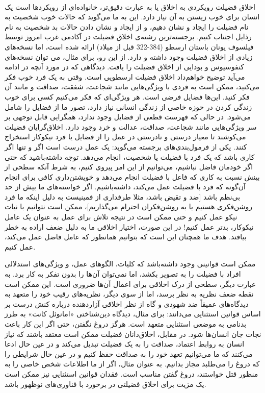 \paragraph{}
اخلاق فضیلت رویکردی به اخلاق یا به عبارت دقیق‌تر، خانواده‌ای از رویکردها است یک انسان برای خوب زیستن به آن نیاز دارد.
این به ما می‌گوید که حالات خوب شخصیت به نام فضیلت را ایجاد و نشان دهیم، و از ایجاد و نشان دادن حالات بد شخصیت به نام رذایل اجتناب کنیم.
برجسته‌ترین رشته‌ی اخلاق فضیلت در آکادمی غرب امروز توسط فیلسوف یونان باستان ارسطو (384-322 قبل از میلاد) ارائه شده است، اما نسخه‌های زیادی از اخلاق فضیلت وجود داشته و دارد.
از این رو، برای مثال، می توان نسخه‌های کنفوسیوس و بودایی از اخلاق فضیلت را یافت.
دیدگاهی که در مورد آنچه در ادامه می‌آید توضیح خواهم‌داد اخلاق فضیلت ارسطویی است.
وقتی به یک فرد خوب فکر می‌کنید، ممکن است به فردی با ویژگی‌هایی مانند شجاعت، شفقت، صداقت و مانند آن فکر کنید.
این‌ها فضایل فرضی است.
هر ویژگی‌ای که فکر می‌کنیم کسی برای خوب زندگی کردن در حوزه خاصی از زندگی انسانی نیاز دارد، تصور ما از فضایل را شامل می‌شود.
در حالی که فهرست قطعی از فضایل وجود ندارد، همگرایی قابل توجهی بر سر ویژگی‌هایی مانند شجاعت، صداقت، عدالت و خرد وجود دارد.
اخلاق‌گرایان فضیلت می‌کوشند تا معیار درستی و نادرستی در عمل را از فضایل یا فرد نیکوکار استخراج کنند.
یکی از فرمول‌بندی‌های برجسته می‌گوید: یک عمل درست است اگر و تنها اگر کاری باشد که یک فرد با فضیلت یا شخصیت، انجام می‌دهد.
توجه داشته‌باشید که حتی اگر خودمان فاضل نباشیم، می‌توانیم از این امر پیروی کنیم، به شرط آنکه سطحی از بینش نسبت به کاری که فاعل با فضیلت انجام می‌دهد و خویشتن‌داری کافی برای انجام آن‌گونه که فرد با فضیلت عمل می‌کند، داشته‌باشیم.
اگر خواسته‌های ما بیش از حد بی‌نظم باشد [ضد و تقیض باشد، مثلا طرفداری از فمینیست به دلیل اینکه ما فرد روشن‌فکری هستیم یا به روشن‌فکران احترام می‌گذاریم]، ممکن است نتوانیم با نیات نیکو عمل کنیم و حتی ممکن است در نتیجه تلاش برای عمل به عنوان یک عامل نیکوکار، بدتر عمل کنیم!
در این صورت، اختیار اخلاقی ما به دلیل ضعف اراده به خطر بیافتد.
هدف ما همچنان این است که بتوانیم همانطور که عامل فاضل عمل می‌کند، عمل کنیم.

ممکن است قوانینی وجود داشته‌باشد که کلیات، الگوهای عمل، و ویژگی‌های استدلالی افراد با فضیلت را به تصویر بکشد، اما نمی‌توان آن‌ها را بدون تفکر به کار برد.
به عبارت دیگر، سطحی از درک اخلاقی برای اعمال آن‌ها ضروری است.
این ممکن است نقطه ضعف نظریه به نظر برسد، اما از سوی دیگر، نظریه‌های رقیب خود را متعهد به دیدگاه‌های عمیقاً ضد شهودی و گاه از نظر اخلاقی آزاردهنده درباره کنش درست بر اساس قوانین استثنایی می‌دانند: برای مثال، دیدگاه دین‌شناختی «امانوئل کانت» به طرز بدنامی به موضعی استثنایی متعهد است.
هرگز دروغ نگفتن، حتی اگر این کار باعث نجات جان انسان‌ها شود.
در مقابل، اخلاق‌دانان فضیلت ممکن است معتقد باشند که نیاز انسان به روابط اعتماد، صداقت را به یک فضیلت تبدیل می‌کند و در عین حال ادعا می‌کنند که ما می‌توانیم تعهد خود را به صداقت حفظ کنیم و در عین حال شرایطی را که دروغ را می‌طلبد مجاز بدانیم.
به عنوان مثال، اگر از ما اطلاعات شخص خاصی را به منظور قتل خواستند، دروغ گفتن مناسب است.
فقدان قوانین استثنایی نیز ممکن است یک مزیت برای اخلاق فضیلتی در برخورد با فناوری‌های نوظهور باشد.

